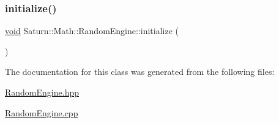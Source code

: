 \mbox{\label{class_saturn_1_1_math_1_1_random_engine_a22ed5a73fe191681df0efe13998704de}} 
\subsubsection{\texorpdfstring{initialize()}{initialize()}}
{\footnotesize\ttfamily \mbox{\hyperlink{glad_8h_a950fc91edb4504f62f1c577bf4727c29}{void}} Saturn\+::\+Math\+::\+Random\+Engine\+::initialize (\begin{DoxyParamCaption}{ }\end{DoxyParamCaption})\hspace{0.3cm}{\ttfamily [static]}}



The documentation for this class was generated from the following files\+:\begin{DoxyCompactItemize}
\item 
\mbox{\hyperlink{_random_engine_8hpp}{Random\+Engine.\+hpp}}\item 
\mbox{\hyperlink{_random_engine_8cpp}{Random\+Engine.\+cpp}}\end{DoxyCompactItemize}
